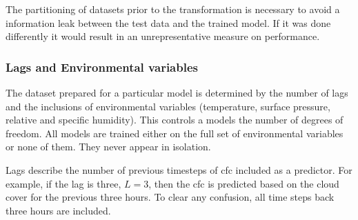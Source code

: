 The partitioning of datasets prior to the transformation is necessary to avoid a information leak between the test data and the trained model. If it was done differently it would result in an unrepresentative measure on performance.

 


\subsubsection{Lags and Environmental variables}
The dataset prepared for a particular model is determined by the number of lags and the inclusions of environmental variables (temperature, surface pressure, relative and specific humidity). This controls a models the number of degrees of freedom. All models are trained either on the full set of environmental variables or none of them. They never appear in isolation. 

Lags describe the number of previous timesteps of \acrshort{cfc} included as a predictor. For example, if the lag is three, $L=3$, then the \acrshort{cfc} is predicted based on the cloud cover for the previous three hours. To clear any confusion, all time steps back three hours are included.

